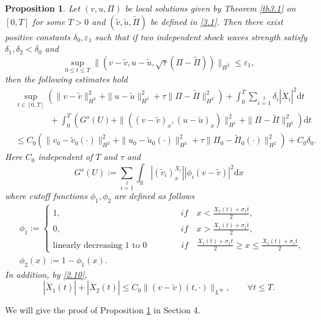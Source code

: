\documentclass[10pt,reqno]{amsart}
\numberwithin{equation}{section}
\newtheorem{prop}{Proposition}[section]
\newcommand{\dif}{\mathrm{d}}
\begin{document}
\begin{prop}\label{p1}
Let $(v, u, \Pi)$ be local solutions given by Theorem \ref{th3.1} on $[0,T]$ for some $T>0$ and $(\widetilde{v},\widetilde{u},\widetilde{\Pi})$ be defined in \eqref{3.1}.  Then there exist positive constants $\delta_0,\varepsilon_1$ such that if two independent shock waves strength satisfy $\delta_1,\delta_2<\delta_0$ and
\begin{equation}\label{3.5}
\sup_{0\le t\le T} \|(v-\widetilde{v}, u-\widetilde{u}, \sqrt{\tau}(\Pi-\widetilde{\Pi}))\|_{H^2}\leq\varepsilon_1,
\end{equation}
then the following estimates hold
\begin{equation}\label{3.6}
\begin{aligned}
&\sup\limits_{t\in[0,T]}\left(\|v-\widetilde{v}\|^2_{H^2}
+\|u-\widetilde{u}\|^2_{H^2}+\tau\|\Pi-\widetilde{\Pi}\|^2_{H^2}\right)
+\int_0^T\sum\limits_{i=1}\limits^2\delta_i|\dot{X}_i|^2\dif t\\
&\qquad\qquad+\int_0^T\left(G^s(U)
+\|\left((v-\widetilde{v})_{x}, (u-\widetilde{u})_{x}\right)\|^2_{H^1}+\|\Pi-\widetilde{\Pi}\|^2_{H^2}\right)\dif t\\
&\leq C_0\left(\|v_0-\widetilde{v}_0(\cdot)\|^2_{H^2}+\|u_0-\widetilde{u}_0(\cdot)\|^2_{H^2}
+\tau\|\Pi_0-\widetilde{\Pi}_0(\cdot)\|^2_{H^2}\right)+C_0\delta_0.
\end{aligned}
\end{equation}
Here $C_0$ independent of $T$ and $\tau$ and
\begin{equation}\label{3.7}
G^s(U):=\sum\limits_{i=1}\limits^2\int_\mathbb{R}|(\widetilde{v}_i)^{X_i}_{x}| |\phi_i(v -\widetilde{v})|^2\dif x
\end{equation}
where cutoff functions $\phi_1,\phi_2$ are defined as follows
\begin{equation}\label{ctf9.15}
\begin{aligned}
&\phi_1:=
\begin{cases}
1,\qquad\qquad\qquad \qquad \qquad \qquad \qquad    if \quad  x<\frac{X_1(t)+\sigma_1t}{2},  \\
0,\qquad\qquad\qquad \qquad \qquad\qquad \qquad     if \quad  x>\frac{X_1(t)+\sigma_1t}{2},  \\
\text{linearly decreasing 1 to 0} \qquad\qquad   if \quad  \frac{X_1(t)+\sigma_1t}{2}\ge x\le \frac{X_1(t)+\sigma_1t}{2},
\end{cases}\\
&\phi_2(x):=1-\phi_1(x).
\end{aligned}
\end{equation}
In addition, by \eqref{2.10},
\begin{equation}\label{3.8}
|\dot{X}_1(t)|+|\dot{X}_2(t)|\leq C_0\|(v-\widetilde{v})(t,\cdot)\|_{L^{\infty}},\qquad\forall t\leq T.
\end{equation}
\end{prop}
We will give the proof of Proposition \ref{p1} in Section 4.
\end{document}
